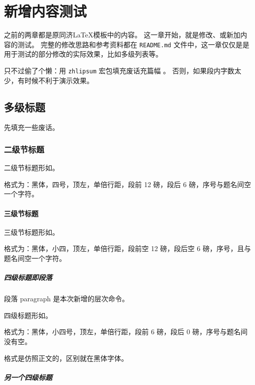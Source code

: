 \documentclass[../Main/thesis]{subfiles}
\begin{document}
\chapter{新增内容测试}
\label{cha:new}

之前的两章都是原同济LaTeX模板中的内容。
这一章开始，就是修改、或新加内容的测试\cite{mohrssBIM}。
完整的修改思路和参考资料都在 \texttt{README.md} 文件中，这一章仅仅是是用于测试的部分修改的实际效果，比如多级列表等。

只不过偷了个懒：用 \verb|zhlipsum| 宏包填充废话充篇幅 \cite{HowDigital}。
否则，如果段内字数太少，有时候不利于演示效果。

\section{多级标题} \label{sec:seclv}

先填充一些废话。\zhlipsum[4]

\subsection{二级节标题} \label{ssc:subsec2}

二级节标题形如。

格式为：黑体，四号，顶左，单倍行距，段前 12 磅，段后 6 磅，序号与题名间空一个字符。

\subsubsection{三级节标题} \label{sss:subsub3}

三级节标题形如。

格式为：黑体，小四，顶左，单倍行距，段前空 12 磅，段后空 6 磅，序号，且与题名间空一个字符。

\paragraph{四级标题即段落} \label{par:par4}

段落 paragraph 是本次新增的层次命令。

四级标题形如。

格式为：黑体，小四号，顶左，单倍行距，段前 6 磅，段后 0 磅，序号与题名间没有空。

格式是仿照正文的，区别就在黑体字体。

\paragraph{另一个四级标题} \label{spr:subpar}
\end{document}
